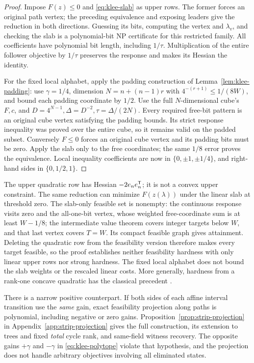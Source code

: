 \begin{proof}
Impose \(F(z)\le0\) and \eqref{eq:klee-slab} as upper rows. The former forces
an original path vertex; the preceding equivalence and exposing leaders give
the reduction in both directions. Guessing its bits, computing the vertex and
\(\lambda_v\), and checking the slab is a polynomial-bit NP certificate for
this restricted family. All coefficients have polynomial bit length, including
\(1/\tau\). Multiplication of the entire follower objective by \(1/\tau\)
preserves the response and makes its Hessian the identity.

For the fixed local alphabet, apply the padding construction of
Lemma~\ref{lem:klee-padding}: use \(\gamma=1/4\), dimension
\(N=n+(n-1)r\) with \(4^{-(r+1)}\le1/(8W)\), and bound each padding
coordinate by \(1/2\). Use the full \(N\)-dimensional cube's \(F,c\), and
\(D=4^{N-1},\Delta=D^{-2},\tau=\Delta/(2N)\). Every required free-bit
pattern is an original cube vertex satisfying the padding bounds. Its strict
response inequality was proved over the entire cube, so it remains valid on
the padded subset. Conversely \(F\le0\) forces an original cube vertex and
its padding bits must be zero. Apply the slab only to the free coordinates;
the same \(1/8\) error proves the equivalence. Local inequality coefficients
are now in \(\{0,\pm1,\pm1/4\}\), and right-hand sides in \(\{0,1/2,1\}\).
\end{proof}
The upper quadratic row has Hessian \(-2e_ne_n^{\mathsf T}\); it is not a convex
upper constraint. The same reduction can minimize \(F(z(\lambda))\) under the
linear slab at threshold zero. The slab-only feasible set is nonempty: the
continuous response visits zero and the all-one-bit vertex, whose weighted
free-coordinate sum is at least \(W-1/8\); the intermediate value theorem
covers integer targets below \(W\), and that last vertex covers \(T=W\).
Its compact feasible graph gives attainment. Deleting the quadratic row from
the feasibility version therefore makes every target feasible, so the proof
establishes neither feasibility hardness with only linear upper rows nor
strong hardness. The fixed local alphabet does not bound the slab weights or
the rescaled linear costs. More generally, hardness from a rank-one concave
quadratic has the classical precedent \citet{PardalosVavasis1991}.

There is a narrow positive counterpart. If both sides of each affine interval
transition use the \emph{same} gain, exact feasibility projection along paths
is polynomial, including negative or zero gains. Proposition~\ref{prop:strip-projection}
in Appendix~\ref{app:strip-projection} gives the full construction, its extension
to trees and fixed \emph{total} cycle rank, and same-field witness recovery.
The opposite gains \(+\gamma\) and \(-\gamma\) in
\eqref{eq:klee-polytope} violate that hypothesis, and the projection does not
handle arbitrary objectives involving all eliminated states.

